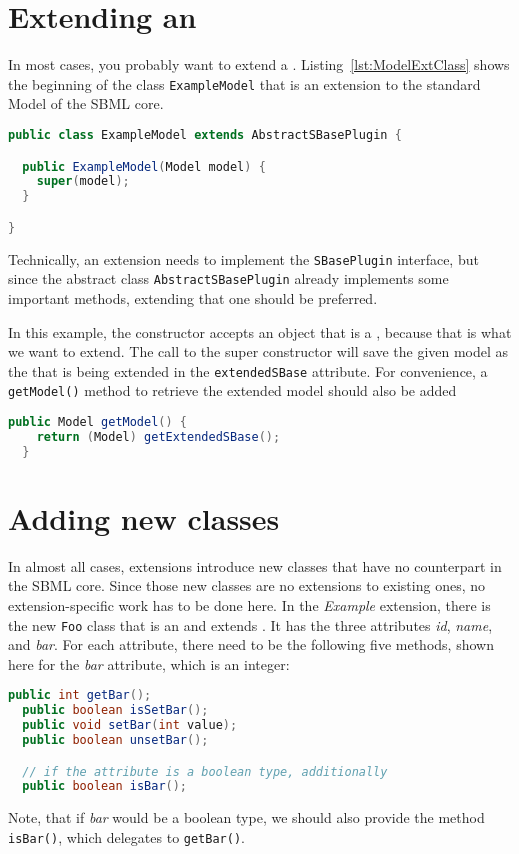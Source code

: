 \section{Extending an \SBase}
\label{subsec:extendingSBase}

In most cases, you probably want to extend a \Model.
Listing~\vref{lst:ModelExtClass} shows the beginning of the class
\texttt{ExampleModel} that is an extension to the standard Model of the SBML core.
\begin{lstlisting}[language=Java,caption={Extending \texttt{AbstractSBasePlugin}},label={lst:ModelExtClass}]
public class ExampleModel extends AbstractSBasePlugin {

  public ExampleModel(Model model) {
    super(model);
  }

}
\end{lstlisting}
Technically, an extension needs to implement the \texttt{SBasePlugin} interface,
but since the abstract class \texttt{AbstractSBasePlugin} already implements some important methods, extending that one should be preferred.

In this example, the constructor accepts an object that is a \Model, because that is what we want to extend.
The call to the super constructor will save the given model as the
\SBase{} that is being extended in the \texttt{extendedSBase} attribute.
For convenience, a \texttt{getModel()} method to retrieve the extended model
should also be added 
\begin{lstlisting}[language=Java,caption={Convenience method to retrieve the extended model},label={lst:ModelExtGetModel}]
  public Model getModel() {
    return (Model) getExtendedSBase();
  }
\end{lstlisting}


\section{Adding new classes}
\label{subsec:addingClasses}

In almost all cases, extensions introduce new classes that have no counterpart
in the SBML core. Since those new classes are no extensions to existing ones,
no extension-specific work has to be done here. In the \emph{Example}
extension, there is the new \texttt{Foo} class that is an \SBase{} and extends
\AbstractNamedSBase. It has the three attributes \emph{id}, \emph{name}, and
\emph{bar}. For each attribute, there need to be the following five methods,
shown here for the \emph{bar} attribute, which is an integer:
\begin{lstlisting}[language=Java,float,caption={Five necessary methods that
should be created for each \texttt{Foo} class attribute},label={lst:ModelExtFooBar}]
  public int getBar();
  public boolean isSetBar();
  public void setBar(int value);
  public boolean unsetBar();

  // if the attribute is a boolean type, additionally
  public boolean isBar();
\end{lstlisting}
Note, that if \emph{bar} would be a boolean type, we should also provide the method \texttt{isBar()}, which delegates to \texttt{getBar()}.

